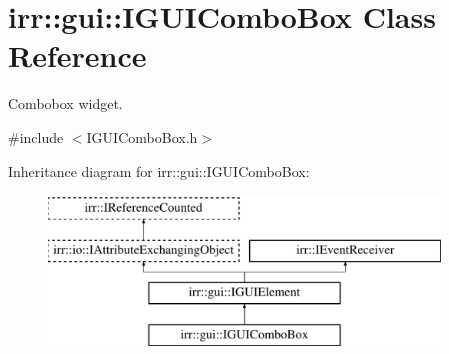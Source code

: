 \hypertarget{classirr_1_1gui_1_1IGUIComboBox}{}\section{irr\+:\+:gui\+:\+:I\+G\+U\+I\+Combo\+Box Class Reference}
\label{classirr_1_1gui_1_1IGUIComboBox}


Combobox widget.  




{\ttfamily \#include $<$I\+G\+U\+I\+Combo\+Box.\+h$>$}

Inheritance diagram for irr\+:\+:gui\+:\+:I\+G\+U\+I\+Combo\+Box\+:\begin{figure}[H]
\begin{center}
\leavevmode
\includegraphics[height=4.000000cm]{classirr_1_1gui_1_1IGUIComboBox}
\end{center}
\end{figure}
